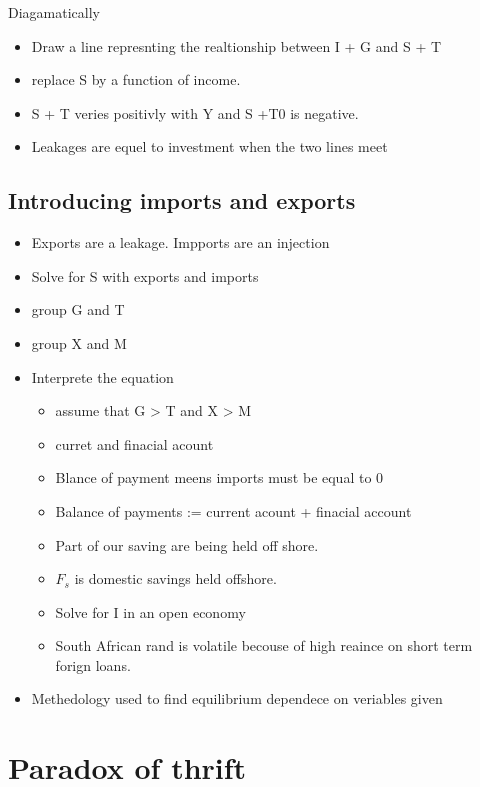 \documentclass[twocolumn]{article}
\providecommand{\tightlist}{%
  \setlength{\itemsep}{0pt}\setlength{\parskip}{0pt}}
\begin{document}
Diagamatically

\begin{itemize}
\tightlist
\item
  Draw a line represnting the realtionship between I + G and S + T
\item
  replace S by a function of income.
\item
  S + T veries positivly with Y and S +T0 is negative.
\item
  Leakages are equel to investment when the two lines meet
\end{itemize}

\hypertarget{introducing-imports-and-exports}{%
\subsection{Introducing imports and
exports}\label{introducing-imports-and-exports}}

\begin{itemize}
\tightlist
\item
  Exports are a leakage. Impports are an injection
\item
  Solve for S with exports and imports
\item
  group G and T
\item
  group X and M
\item
  Interprete the equation

  \begin{itemize}
  \tightlist
  \item
    assume that G \textgreater{} T and X \textgreater{} M
  \item
    curret and finacial acount
  \item
    Blance of payment meens imports must be equal to 0
  \item
    Balance of payments := current acount + finacial account
  \item
    Part of our saving are being held off shore.
  \item
    \(F_s\) is domestic savings held offshore.
  \item
    Solve for I in an open economy
  \item
    South African rand is volatile becouse of high reaince on short term
    forign loans.
  \end{itemize}
\item
  Methedology used to find equilibrium dependece on veriables given
\end{itemize}

\hypertarget{paradox-of-thrift}{%
\section{Paradox of thrift}\label{paradox-of-thrift}}
\end{document}
